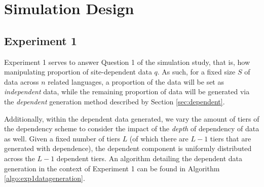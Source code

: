 \section{Simulation Design}
\label{sec:simdesign}
\subsection{Experiment 1}
Experiment 1 serves to answer Question 1 of the simulation study, that is, how manipulating proportion of site-dependent data $q$. As such, for a fixed size $S$ of data across $n$ related languages, a proportion of the data will be set as \textit{independent} data, while the remaining proportion of data will be generated via the \textit{dependent} generation method described by Section \ref{sec:dependent}. 

Additionally, within the dependent data generated, we vary the amount of tiers of the dependency scheme to consider the impact of the \textit{depth} of dependency of data as well. Given a fixed number of tiers $L$ (of which there are $L-1$ tiers that are generated with dependence), the dependent component is uniformly distributed across the $L-1$ dependent tiers. An algorithm detailing the dependent data generation in the context of Experiment 1 can be found in Algorithm \ref{algo:exp1datageneration}.

